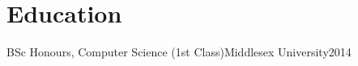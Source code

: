 \section{Education}
\mySubHeadingListStart

  \mySubHeadingOneRow
    {BSc Honours, Computer Science (1st Class)}{Middlesex University}{2014}
    \myItemListStart
    \myItemListEnd

\mySubHeadingListEnd
